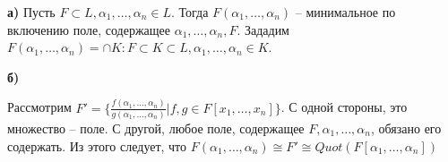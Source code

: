 \textbf{а)}
Пусть $F \subset L, \alpha_1, \ldots, \alpha_n \in L$. Тогда $F(\alpha_1, \ldots, \alpha_n)$ -- минимальное по включению поле, содержащее $\alpha_1, \ldots, \alpha_n, F$. Зададим $F(\alpha_1, \ldots, \alpha_n) = \cap K : F \subset K \subset L, \alpha_1, \ldots, \alpha_n \in K$.

\textbf{б)}

Рассмотрим $F' = \{\frac{f(\alpha_1, \ldots, \alpha_n)}{g(\alpha_1, \ldots, \alpha_n)}| f, g \in F[x_1, \ldots, x_n]\}$. С одной стороны, это множество -- поле. С другой, любое поле, содержащее $F, \alpha_1, \ldots, \alpha_n$, обязано его содержать. Из этого следует, что $F(\alpha_1, \ldots, \alpha_n) \cong F' \cong Quot(F[\alpha_1, \ldots, \alpha_n])$
